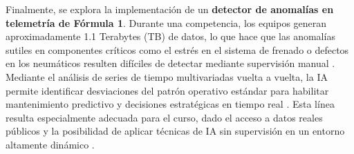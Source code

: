 Finalmente, se explora la implementación de un \textbf{detector de anomalías en telemetría de Fórmula 1}. Durante una competencia, los equipos generan aproximadamente 1.1 Terabytes (TB) de datos, lo que hace que las anomalías sutiles en componentes críticos como el estrés en el sistema de frenado o defectos en los neumáticos resulten difíciles de detectar mediante supervisión manual \cite{f1_telemetry, fastf1_python}. Mediante el análisis de series de tiempo multivariadas vuelta a vuelta, la IA permite identificar desviaciones del patrón operativo estándar para habilitar mantenimiento predictivo y decisiones estratégicas en tiempo real \cite{f1_predictive_maintenance}. Esta línea resulta especialmente adecuada para el curso, dado el acceso a datos reales públicos y la posibilidad de aplicar técnicas de IA sin supervisión en un entorno altamente dinámico \cite{mercedes_f1_data}.

\pagebreak